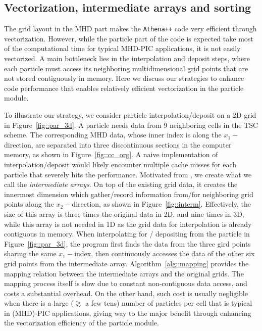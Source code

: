 \documentclass[fleqn,usenatbib]{mnras}
\begin{document}
\subsection{Vectorization, intermediate arrays and sorting}
\label{sec::vec}
The grid layout in the MHD part makes the \texttt{Athena++} code very efficient through vectorization.
However, while the particle part of the code is expected take most of the computational time for typical MHD-PIC applications, it is not easily vectorized. A main bottleneck lies in the interpolation and deposit steps, where each particle must access its neighboring multidimensional grid points that are not stored contiguously in memory. Here we discuss our strategies to enhance code performance that enables relatively efficient vectorization in the particle module.

To illustrate our strategy, we consider particle interpolation/deposit on a 2D grid in Figure~\ref{fig::par_3d}.
A particle needs data from 9 neighboring cells in the TSC scheme. The corresponding MHD data, whose inner index is along the $x_1-$direction, are separated into three discontinuous sections in the computer memory, as shown in Figure~\ref{fig::cc_org}. A naive implementation of interpolation/deposit would likely encounter multiple cache misses for each particle that severely hits the performance.
Motivated from \citet{2017CoPhC.210..145V}, we
create what we call the {\it intermediate arrays}.
On top of the existing grid data, it creates the innermost dimension which gather/record information from/for neighboring grid points along the $x_2-$direction, as shown in Figure~\ref{fig::interm}. Effectively, the size of this array is three times the original data in 2D, and nine times in 3D, while this array is not needed in 1D as the grid data for interpolation is already contiguous in memory.
When interpolating for / depositing from the particle in Figure~\ref{fig::par_3d}, the program first finds the data from the three gird points sharing the same $x_1-$index, then continuously accesses the data of the other six grid points from the intermediate array. Algorithm~\ref{alg::mapping} provides the mapping relation between the intermediate arrays and the original grids. The mapping process itself is slow due to constant non-contiguous data access, and costs a substantial overhead.
On the other hand, such cost is usually negligible when there is a large ($\gtrsim$ a few tens) number of particles per cell that is typical in (MHD)-PIC applications, giving way to the major benefit through enhancing the vectorization efficiency of the particle module.
\end{document}

